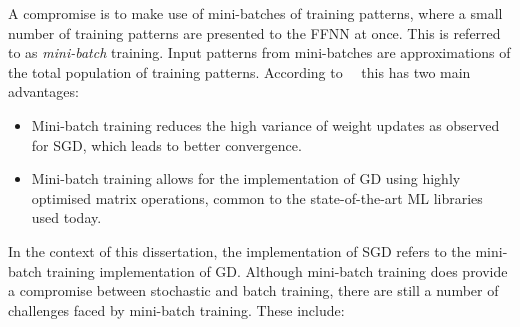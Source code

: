 A compromise is to make use of mini-batches of training patterns, where a small number of training patterns are presented to the \acs{FFNN} at once. This is referred to as \textit{mini-batch} training. Input patterns from mini-batches are approximations of the total population of training patterns. According to~\citeauthor{ref:ruder:2016}~\cite{ref:ruder:2016} this has two main advantages:

\begin{itemize}
	\item Mini-batch training reduces the high variance of weight updates as observed for \acs{SGD}, which leads to better convergence.

	\item Mini-batch training allows for the implementation of \acs{GD} using highly optimised matrix operations, common to the state-of-the-art \acs{ML} libraries used today.
\end{itemize}

In the context of this dissertation, the implementation of \acs{SGD} refers to the mini-batch training implementation of \acs{GD}. Although mini-batch training does provide a compromise between stochastic and batch training, there are still a number of challenges faced by mini-batch training. These include:

